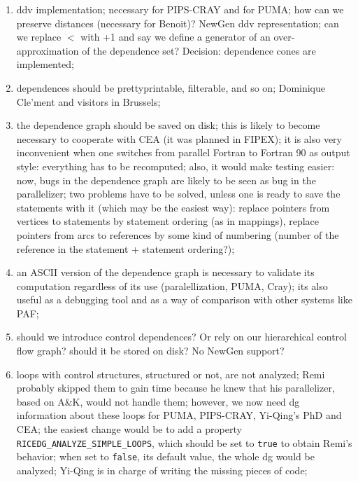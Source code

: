\begin{enumerate}

  \item ddv implementation; necessary for
	PIPS-CRAY and for PUMA; how can we preserve distances (necessary for
	Benoit)? NewGen	ddv representation;  can we replace $<$ with
	+1 and say we define a generator of an over-approximation of the
	dependence set?  Decision: dependence cones are implemented;

  \item {} dependences should be prettyprintable, 
	filterable, and so on; Dominique Cle'ment and visitors in
	Brussels;

  \item the dependence graph should be saved on disk; this is likely
	to become necessary to cooperate with CEA (it was planned
	in FIPEX); it is also very inconvenient when one switches
	from parallel Fortran to Fortran 90 as output style: everything
	has to be recomputed; also, it would make testing easier: now,
	bugs in the dependence graph are likely to be seen as bug in the
	parallelizer; two problems have to be solved, unless one is
	ready to save the statements with it (which may be the easiest
	way): replace pointers from vertices to statements by statement
	ordering (as in mappings), replace pointers from arcs to
	references by some kind of numbering (number of the reference
	in the statement + statement ordering?);

  \item {}
         an ASCII version of the dependence graph is necessary to validate
         its computation regardless of its use (paralellization, PUMA, Cray);
         its also useful as a debugging tool and as a way of comparison with
         other systems like PAF;

  \item should we introduce control dependences?
	Or rely on our hierarchical control flow graph? should it be
        stored on disk? No NewGen support? 

  \item {} loops with control structures, structured or not,
       are not analyzed; Remi probably skipped them to gain time because he
       knew that his parallelizer, based on A\&K, would not handle them;
       however, we now need dg information about these loops for PUMA,
       PIPS-CRAY, Yi-Qing's PhD and CEA; the easiest change would be to add a
       property
\verb+RICEDG_ANALYZE_SIMPLE_LOOPS+, which should be set to
\verb+true+ to obtain Remi's behavior; when set to \verb+false+,
its default value, the whole dg would be analyzed; Yi-Qing is in
charge of writing the missing pieces of code; 


\end{enumerate}

